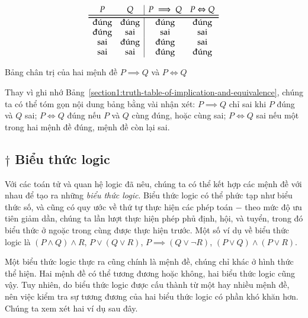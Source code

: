 \begin{table}[htp]
    \centering
    \[
        \begin{array}{cc|cc}
            P           & Q           & P\implies Q & P\Leftrightarrow Q \\
            \toprule
            \bottomrule
            \text{đúng} & \text{đúng} & \text{đúng} & \text{đúng}        \\
            \text{đúng} & \text{sai}  & \text{sai}  & \text{sai}         \\
            \text{sai}  & \text{đúng} & \text{đúng} & \text{sai}         \\
            \text{sai}  & \text{sai}  & \text{đúng} & \text{đúng}
        \end{array}
    \]
    \caption{Bảng chân trị của hai mệnh đề $P\implies Q$ và $P\Leftrightarrow Q$}\label{section1:truth-table-of-implication-and-equivalence}
\end{table}

Thay vì ghi nhớ Bảng~\ref{section1:truth-table-of-implication-and-equivalence}, chúng ta có thể tóm gọn nội dung bảng bằng vài nhận xét: $P\implies Q$ chỉ sai khi $P$ đúng và $Q$ sai; $P\Leftrightarrow Q$ đúng nếu $P$ và $Q$ cùng đúng, hoặc cùng sai; $P\Leftrightarrow Q$ sai nếu một trong hai mệnh đề đúng, mệnh đề còn lại sai.

\subsection*{$\dagger$ Biểu thức logic}

Với các toán tử và quan hệ logic đã nêu, chúng ta có thể kết hợp các mệnh đề với nhau để tạo ra những \textit{biểu thức logic}. Biểu thức logic có thể phức tạp như biểu thức số, và cũng có quy ước về thứ tự thực hiện các phép toán $-$ theo mức độ ưu tiên giảm dần, chúng ta lần lượt thực hiện phép phủ định, hội, và tuyển, trong đó biểu thức ở ngoặc trong cùng được thực hiện trước. Một số ví dụ về biểu thức logic là $(P\wedge Q)\wedge R$, $P\vee (Q\vee R)$, $P \implies (Q\vee \neg R)$, $(P\vee Q) \wedge (P\vee R)$.

Một biểu thức logic thực ra cũng chính là mệnh đề, chúng chỉ khác ở hình thức thể hiện. Hai mệnh đề có thể tương đương hoặc không, hai biểu thức logic cũng vậy. Tuy nhiên, do biểu thức logic được cấu thành từ một hay nhiều mệnh đề, nên việc kiểm tra sự tương đương của hai biểu thức logic có phần khó khăn hơn. Chúng ta xem xét hai ví dụ sau đây.

